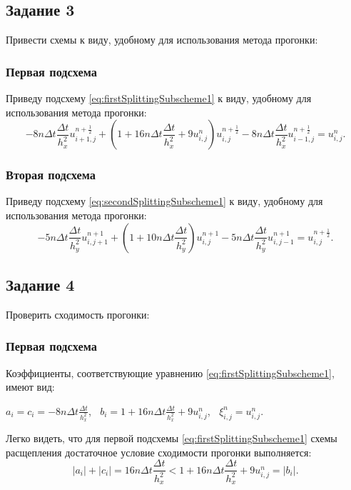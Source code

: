 \documentclass[12pt, a4paper]{report}
\begin{document}
	\subsection*{Задание 3}
	\large
	Привести схемы к виду, удобному для использования метода прогонки: \par
	\subsubsection*{Первая подсхема}
	\large
	Приведу подсхему \eqref{eq:firstSplittingSubscheme1} к виду, удобному для использования метода прогонки:
	\small
	\begin{equation*}
		-8n\Delta t\frac{\Delta t}{h_{x}^{2}}u_{i+1, j}^{n+\frac{1}{2}} + (1 + 16n\Delta t\frac{\Delta t}{h_{x}^{2}} + 9u_{i, j}^{n})u_{i, j}^{n+\frac{1}{2}} - 8n\Delta t\frac{\Delta t}{h_{x}^{2}}u_{i-1, j}^{n+\frac{1}{2}} = u_{i, j}^{n}.
	\end{equation*}
	\subsubsection*{Вторая подсхема}
	\large
	Приведу подсхему \eqref{eq:secondSplittingSubscheme1} к виду, удобному для использования метода прогонки:
	\begin{equation*}
		-5n\Delta t\frac{\Delta t}{h_{y}^{2}}u_{i, j+1}^{n+1} + (1 + 10n\Delta t\frac{\Delta t}{h_{y}^{2}})u_{i, j}^{n+1} - 5n\Delta t\frac{\Delta t}{h_{y}^{2}}u_{i, j-1}^{n+1} = u_{i, j}^{n+\frac{1}{2}}.
	\end{equation*}

	\subsection*{Задание 4}
	\large
	Проверить сходимость прогонки: \par
	\subsubsection*{Первая подсхема}
	\large
	Коэффициенты, соответствующие уравнению \eqref{eq:firstSplittingSubscheme1}, имеют вид:
	\small
	\begin{center}
		$a_{i}=c_{i}=-8n\Delta t\frac{\Delta t}{h_{x}^{2}}$, $\>$ $b_{i}=1 + 16n\Delta t\frac{\Delta t}{h_{x}^{2}} + 9u_{i, j}^{n}$, $\>$ $\xi_{i, j}^{n}=u_{i, j}^{n}$.
	\end{center}
	\par
	\large
	Легко видеть, что для первой подсхемы \eqref{eq:firstSplittingSubscheme1} схемы расщепления достаточное условие сходимости прогонки выполняется:
	\begin{equation*}
		\lvert a_{i} \rvert + \lvert c_{i} \rvert = 16n\Delta t\frac{\Delta t}{h_{x}^{2}} < 1 + 16n\Delta t\frac{\Delta t}{h_{x}^{2}} + 9u_{i, j}^{n} = \lvert b_{i} \rvert.
	\end{equation*}
\end{document}
